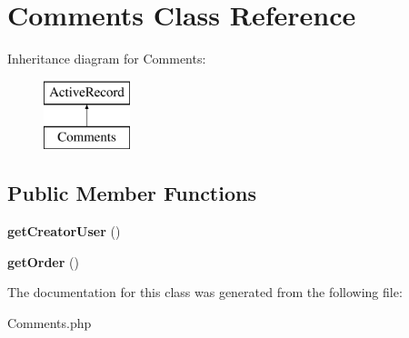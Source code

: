 \hypertarget{classapp_1_1models_1_1_comments}{}\section{Comments Class Reference}
\label{classapp_1_1models_1_1_comments}
Inheritance diagram for Comments\+:\begin{figure}[H]
\begin{center}
\leavevmode
\includegraphics[height=2.000000cm]{classapp_1_1models_1_1_comments}
\end{center}
\end{figure}
\subsection*{Public Member Functions}
\begin{DoxyCompactItemize}
\item 
\hypertarget{classapp_1_1models_1_1_comments_a0f3e89d558c0892aebe1c8d8bb688064}{}\label{classapp_1_1models_1_1_comments_a0f3e89d558c0892aebe1c8d8bb688064} 
{\bfseries get\+Creator\+User} ()
\item 
\hypertarget{classapp_1_1models_1_1_comments_a52f1787c1a4941f65bf728ff3289b626}{}\label{classapp_1_1models_1_1_comments_a52f1787c1a4941f65bf728ff3289b626} 
{\bfseries get\+Order} ()
\end{DoxyCompactItemize}


The documentation for this class was generated from the following file\+:\begin{DoxyCompactItemize}
\item 
Comments.\+php\end{DoxyCompactItemize}
